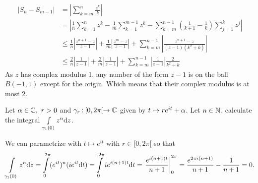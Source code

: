 \documentclass[12pt]{memoir}
\begin{document}
\begin{ptcbr}
\begin{enumerate}[i)]
        \begin{align*}
            |S_n-S_{m-1}|&=\left|\sum_{k=m}^n\frac{z^k}{k}\right|\\
            &=\left|\frac{1}{n}\sum_{k=1}^nz^k-\frac{1}{m}\sum_{k=1}^{m-1}z^k-\sum_{k=m}^{n-1}\left(\frac{1}{k+1}-\frac1k\right)\sum_{j=1}^k z^j\right|\\
            &\leq \frac{1}{n}\left|\frac{z^{n+1}-z}{z-1}\right|+\frac{1}{m}\left|\frac{z^{m}-z}{z-1}\right|+\sum_{k=m}^{n-1}\left|\frac{z^{n+1}-z}{(z-1)(k^2+k)}\right|\\
            &\leq \frac{2}{n}\left|\frac{1}{z-1}\right|+\frac{2}{m}\left|\frac{1}{z-1}\right|+\sum_{k=m}^{n-1}\left|\frac{1}{z-1}\right|\frac{2}{k^2+k}
        \end{align*}
        As $z$ has complex modulus 1, any number of the form $z-1$ is on the ball $B(-1,1)$ except for the origin. Which means that their complex modulus is at most 2. 
    \end{enumerate}
\end{ptcbr}
\begin{Ej}
    Let $\alpha\in\mathbb{C},\ r>0$ and $\gamma_r\mathbin{:} [0,2\pi[\to\mathbb{C}$ given by $t\mapsto re^{it}+\alpha$. Let $n\in\mathbb{N}$, calculate the integral $\int\limits_{\gamma_1(0)}z^n\dd z$.
\end{Ej}

\begin{ptcbr}
    We can parametrize with $t\mapsto e^{it}$ with $r\in[0,2\pi[$ so that 
    $$\int\limits_{\ga_1(0)}z^n\dd z=\int\limits_0^{2\pi}(e^{it})^n(ie^{it}\dd t)=\int\limits_0^{2\pi}ie^{i(n+1)t}\dd t=\eval{\frac{e^{i(n+1)t}}{n+1}}_{0}^{2\pi}=\frac{e^{2\pi i(n+1)}}{n+1}-\frac{1}{n+1}=0.$$
\end{ptcbr}
\end{document}
